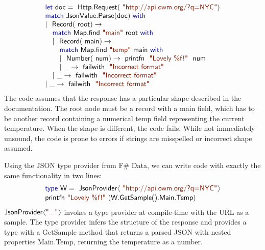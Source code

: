\documentclass[10pt,nocopyrightspace]{sigplanconf}
\newcommand{\langl}{\begin{picture}(4.5,7)
\put(1.1,2.5){\rotatebox{60}{\line(1,0){5.5}}}
\put(1.1,2.5){\rotatebox{300}{\line(1,0){5.5}}}
\end{picture}}
\newcommand{\rangl}{\begin{picture}(4.5,7)
\put(.9,2.5){\rotatebox{120}{\line(1,0){5.5}}}
\put(.9,2.5){\rotatebox{240}{\line(1,0){5.5}}}
\end{picture}}
\newcommand{\kvd}[1]{\textnormal{\textcolor{kvdclr}{\sffamily #1}}}
\newcommand{\str}[1]{\textnormal{\textcolor{strclr}{\sffamily "#1"}}}
\newcommand{\strf}[1]{\textnormal{\textcolor{strclr}{\sffamily #1}}}
\newcommand{\ident}[1]{\textnormal{\sffamily #1}}
\begin{document}
\begin{equation*}
\begin{array}{l}
 \kvd{let}~\ident{doc}=\ident{Http.Request}(\str{http://api.owm.org/?q=NYC}) \\
 \kvd{match}~\ident{JsonValue.Parse}(\ident{doc})~\kvd{with} \\
 |~\ident{Record}(\ident{root})\rightarrow \\
 \quad \kvd{match}~\ident{Map.find}~\str{main}~\ident{root}~\kvd{with} \\
 \quad |~\ident{Record}(\ident{main})\rightarrow \\
 \quad \quad \kvd{match}~\ident{Map.find}~\str{temp}~\ident{main}~\kvd{with} \\
 \quad \quad |~\ident{Number}(\ident{num})\rightarrow \ident{printfn}~\str{Lovely \%f!}~\ident{num} \\
 \quad \quad |~\_\rightarrow \ident{failwith}~\str{Incorrect format} \\
 \quad |~\_\rightarrow \ident{failwith}~\str{Incorrect format} \\
 |~\_\rightarrow \ident{failwith}~\str{Incorrect format}
\end{array}
\end{equation*}
%
The code assumes that the response has a particular shape described in the documentation. The
root node must be a record with a \strf{main} field, which has to be another record containing
a numerical \strf{temp} field representing the current temperature. When the shape is different,
the code fails. While not immediately unsound, the code is prone to errors if strings are
misspelled or incorrect shape assumed.

Using the JSON type provider from F\# Data, we can write code with exactly the
same functionality in two lines:
%
\vspace{-0.1em}
\begin{equation*}
\begin{array}{l}
 \kvd{type}~\ident{W} = \ident{JsonProvider}\langl\str{http://api.owm.org/?q=NYC}\rangl \\[0.1em]
 \ident{printfn}~\str{Lovely \%f!}~(\ident{W.GetSample().Main.Temp})
\end{array}
\end{equation*}
%
$\ident{JsonProvider}\langl\str{...}\rangl$ invokes a type provider \cite{fsharp-typeprov} at
compile-time with the URL as a sample. The type provider infers the structure of the response
and provides a type with a \ident{GetSample} method that returns a parsed JSON with nested
properties \ident{Main.Temp}, returning the temperature as a number.
\end{document}
